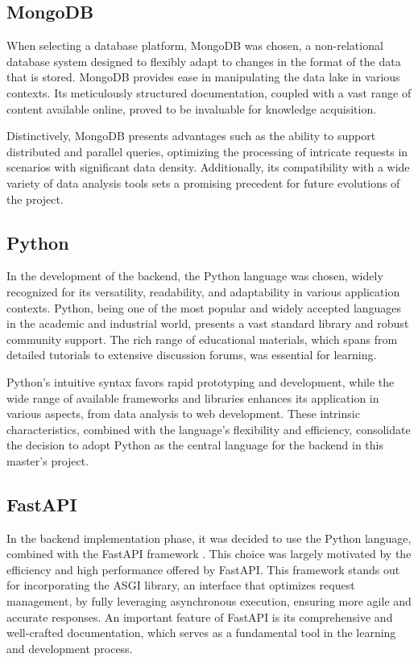 \subsection{MongoDB}

When selecting a database platform, MongoDB \cite{mongodbDocs} was chosen, a non-relational database system designed to flexibly adapt to changes in the format of the data that is stored. MongoDB provides ease in manipulating the data lake in various contexts. Its meticulously structured documentation, coupled with a vast range of content available online, proved to be invaluable for knowledge acquisition.

Distinctively, MongoDB presents advantages such as the ability to support distributed and parallel queries, optimizing the processing of intricate requests in scenarios with significant data density. Additionally, its compatibility with a wide variety of data analysis tools sets a promising precedent for future evolutions of the project.

\subsection{Python}
In the development of the backend, the Python language \cite{pythonOfficialDocs} was chosen, widely recognized for its versatility, readability, and adaptability in various application contexts. Python, being one of the most popular and widely accepted languages in the academic and industrial world, presents a vast standard library and robust community support. The rich range of educational materials, which spans from detailed tutorials to extensive discussion forums, was essential for learning.

Python's intuitive syntax favors rapid prototyping and development, while the wide range of available frameworks and libraries enhances its application in various aspects, from data analysis to web development. These intrinsic characteristics, combined with the language's flexibility and efficiency, consolidate the decision to adopt Python as the central language for the backend in this master's project.

\subsection{FastAPI}
In the backend implementation phase, it was decided to use the Python language, combined with the FastAPI framework \cite{fastapiDocs}. This choice was largely motivated by the efficiency and high performance offered by FastAPI. This framework stands out for incorporating the \gls{ASGI} library, an interface that optimizes request management, by fully leveraging asynchronous execution, ensuring more agile and accurate responses. An important feature of FastAPI is its comprehensive and well-crafted documentation, which serves as a fundamental tool in the learning and development process.

